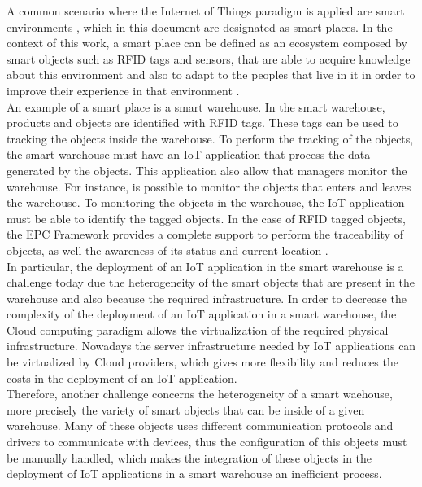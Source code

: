 A common scenario where the Internet of Things paradigm is applied are smart environments \cite{atzori2010internet},
which in this document are designated as smart places. In the context of this work,
a smart place can be defined as an ecosystem composed by smart objects such as RFID
tags and sensors, that are able to acquire knowledge about this environment and also to
adapt to the peoples that live in it in order to improve their experience in that environment \cite{cook2004smart}.\\

An example of a smart place is a smart warehouse. In the smart warehouse, products and objects
are identified with RFID tags. These tags can be used to tracking the objects inside the warehouse.
To perform the tracking of the objects, the smart warehouse must have an IoT application that process
the data generated by the objects. This application also allow that managers monitor the warehouse.
For instance, is possible to monitor the objects that enters and leaves the warehouse.
To monitoring the objects in the warehouse, the IoT application must be able to identify
the tagged objects. In the case of RFID tagged objects, the EPC Framework provides a complete
support to perform the traceability of objects, as well the awareness of its status and
current location \cite{atzori2010internet}.\\

In particular, the deployment of an IoT application in the smart warehouse is a challenge today
due the heterogeneity of the smart objects that are present in the warehouse and also
because the required infrastructure. In order to decrease the complexity of the deployment
of an IoT application in a smart warehouse, the Cloud computing paradigm allows the virtualization
of the required physical infrastructure. Nowadays the server infrastructure needed by IoT
applications can be virtualized by Cloud providers, which gives more flexibility and reduces
the costs in the deployment of an IoT application.\\

Therefore, another challenge concerns the heterogeneity of a smart waehouse, more precisely
the variety of smart objects that can be inside of a given warehouse. Many of these objects uses
different communication protocols and drivers to communicate with devices, thus the configuration
of this objects must be manually handled, which makes the integration of these objects in
the deployment of IoT applications in a smart warehouse an inefficient process.
